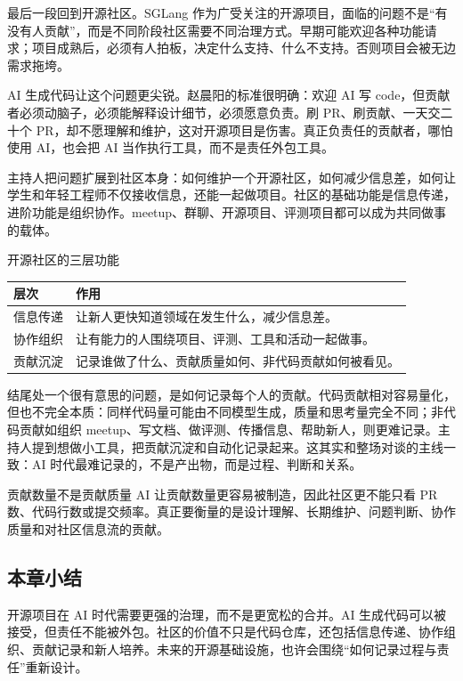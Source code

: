 \documentclass[a4paper]{article}
\begin{document}
最后一段回到开源社区。SGLang 作为广受关注的开源项目，面临的问题不是“有没有人贡献”，而是不同阶段社区需要不同治理方式。早期可能欢迎各种功能请求；项目成熟后，必须有人拍板，决定什么支持、什么不支持。否则项目会被无边需求拖垮。

AI 生成代码让这个问题更尖锐。赵晨阳的标准很明确：欢迎 AI 写 code，但贡献者必须动脑子，必须能解释设计细节，必须愿意负责。刷 PR、刷贡献、一天交二十个 PR，却不愿理解和维护，这对开源项目是伤害。真正负责任的贡献者，哪怕使用 AI，也会把 AI 当作执行工具，而不是责任外包工具。

主持人把问题扩展到社区本身：如何维护一个开源社区，如何减少信息差，如何让学生和年轻工程师不仅接收信息，还能一起做项目。社区的基础功能是信息传递，进阶功能是组织协作。meetup、群聊、开源项目、评测项目都可以成为共同做事的载体。

\begin{knowledgebox}{开源社区的三层功能}
\begin{tabularx}{\textwidth}{>{\raggedright\arraybackslash}p{} Y}
\toprule
层次 & 作用 \\
\midrule
信息传递 & 让新人更快知道领域在发生什么，减少信息差。 \\
协作组织 & 让有能力的人围绕项目、评测、工具和活动一起做事。 \\
贡献沉淀 & 记录谁做了什么、贡献质量如何、非代码贡献如何被看见。 \\
\bottomrule
\end{tabularx}
\end{knowledgebox}

结尾处一个很有意思的问题，是如何记录每个人的贡献。代码贡献相对容易量化，但也不完全本质：同样代码量可能由不同模型生成，质量和思考量完全不同；非代码贡献如组织 meetup、写文档、做评测、传播信息、帮助新人，则更难记录。主持人提到想做小工具，把贡献沉淀和自动化记录起来。这其实和整场对谈的主线一致：AI 时代最难记录的，不是产出物，而是过程、判断和关系。

\begin{warningbox}{贡献数量不是贡献质量}
AI 让贡献数量更容易被制造，因此社区更不能只看 PR 数、代码行数或提交频率。真正要衡量的是设计理解、长期维护、问题判断、协作质量和对社区信息流的贡献。
\end{warningbox}

\subsection{本章小结}

开源项目在 AI 时代需要更强的治理，而不是更宽松的合并。AI 生成代码可以被接受，但责任不能被外包。社区的价值不只是代码仓库，还包括信息传递、协作组织、贡献记录和新人培养。未来的开源基础设施，也许会围绕“如何记录过程与责任”重新设计。
\end{document}
